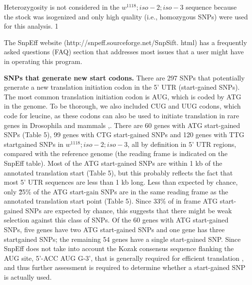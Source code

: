Heterozygosity is not considered in the $w^{1118} ; iso-2; iso-3$ sequence because the stock was isogenized and only high quality (i.e., homozygous SNPs) were used for this analysis. 1 

The SnpEff website (http://snpeff.sourceforge.net/SnpSift.  html) has a frequently asked questions (FAQ) section that addresses most issues that a user might have in operating this program.

\textbf{SNPs that generate new start codons.} There are 297 SNPs that potentially generate a new translation initiation codon in the 5' UTR (start-gained SNPs). The most common translation initiation codon is AUG, which is coded by ATG in the genome.  To be thorough, we also included CUG and UUG codons, which code for leucine, as these codons can also be used to initiate translation in rare genes in Drosophila and mammals \cite{sugihara1990drosophila},\cite{ivanov2011identification}. There are 60 genes with ATG start-gained SNPs (Table 5), 99 genes with CTG start-gained SNPs and 120 genes with TTG startgained SNPs in $w^{1118} ; iso-2; iso-3$, all by definition in 5' UTR regions, compared with the reference genome (the reading frame is indicated on the SnpEff table). Most of the ATG start-gained SNPs are within 1 kb of the annotated translation start (Table 5), but this probably reflects the fact that most 5' UTR sequences are less than 1 kb long. Less than expected by chance, only \~25\% of the ATG start-gain SNPs are in the same reading frame as the annotated translation start point (Table 5). Since 33\% of in frame ATG start-gained SNPs are expected by chance, this suggests that there might be weak selection against this class of SNPs. Of the 60 genes with ATG start-gained SNPs, five genes have two ATG start-gained SNPs and one gene has three startgained SNPs; the remaining 54 genes have a single start-gained SNP. Since SnpEff does not take into account the Kozak consensus sequence flanking the AUG site, 5'-ACC AUG G-3', that is generally required for efficient translation \cite{kozak1987analysis}, and thus further assessment is required to determine whether a start-gained SNP is actually used.

